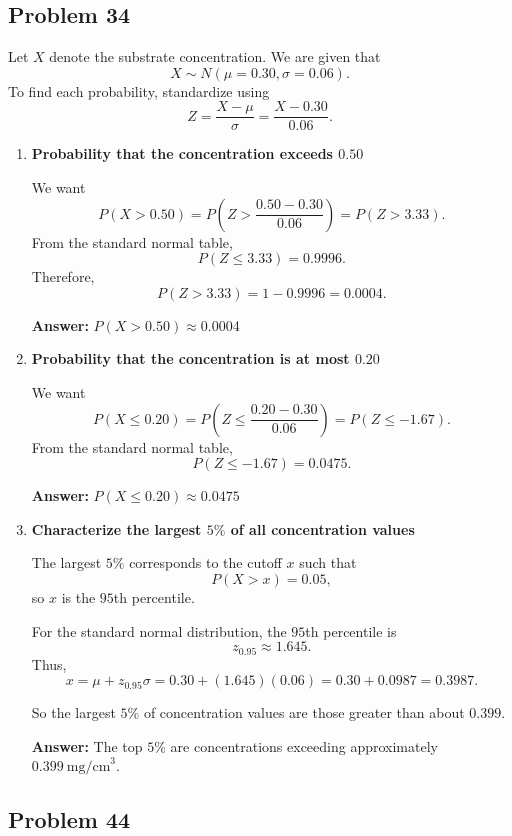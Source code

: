 \subsection*{Problem 34}

Let $X$ denote the substrate concentration. We are given that
\[
X \sim N(\mu=0.30,\sigma=0.06).
\]
To find each probability, standardize using
\[
Z=\frac{X-\mu}{\sigma}=\frac{X-0.30}{0.06}.
\]

\begin{enumerate}
    \item[(a)] \textbf{Probability that the concentration exceeds $0.50$}

    We want
    \[
    P(X>0.50)=P\left(Z>\frac{0.50-0.30}{0.06}\right)
    =P(Z>3.33).
    \]
    From the standard normal table,
    \[
    P(Z\le 3.33)=0.9996.
    \]
    Therefore,
    \[
    P(Z>3.33)=1-0.9996=0.0004.
    \]

    \textbf{Answer:} $P(X>0.50)\approx 0.0004$

    \item[(b)] \textbf{Probability that the concentration is at most $0.20$}

    We want
    \[
    P(X\le 0.20)=P\left(Z\le \frac{0.20-0.30}{0.06}\right)
    =P(Z\le -1.67).
    \]
    From the standard normal table,
    \[
    P(Z\le -1.67)=0.0475.
    \]

    \textbf{Answer:} $P(X\le 0.20)\approx 0.0475$

    \item[(c)] \textbf{Characterize the largest $5\%$ of all concentration values}

    The largest $5\%$ corresponds to the cutoff $x$ such that
    \[
    P(X>x)=0.05,
    \]
    so $x$ is the $95$th percentile.

    For the standard normal distribution, the $95$th percentile is
    \[
    z_{0.95}\approx 1.645.
    \]
    Thus,
    \[
    x=\mu+z_{0.95}\sigma
    =0.30+(1.645)(0.06)
    =0.30+0.0987
    =0.3987.
    \]

    So the largest $5\%$ of concentration values are those greater than about $0.399$.

    \textbf{Answer:} The top $5\%$ are concentrations exceeding approximately $0.399\ \text{mg/cm}^3$.
\end{enumerate}

\subsection*{Problem 44}

